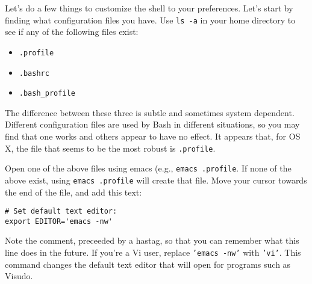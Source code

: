 \documentclass[12pt, letterpaper]{article}
\begin{document}
Let's do a few things to customize the shell to your preferences.  Let's start
by finding what configuration files you have.  Use {\tt ls -a} in your home
directory to see if any of the following files exist:
\begin{itemize}
\item {\tt .profile}
\item {\tt .bashrc}
\item {\tt .bash\_profile}
\end{itemize}

The difference between these three is subtle and sometimes system dependent.
Different configuration files are used by Bash in different situations, so
you may find that one works and others appear to have no effect.
It appears that, for OS X, the file that seems to be the most robust is
{\tt .profile}.

Open one of the above files using emacs (e.g., {\tt emacs .profile}.  If
none of the above exist, using {\tt emacs .profile} will create that file.
Move your cursor towards the end of the file, and add this text:
\begin{verbatim}
# Set default text editor:
export EDITOR='emacs -nw'
\end{verbatim}
Note the comment, preceeded by a hastag, so that you can remember what this
line does in the future.
If you're a Vi user, replace {\tt 'emacs -nw'} with {\tt 'vi'}.  This command
changes the default text editor that will open for programs such as
Visudo.
\end{document}
